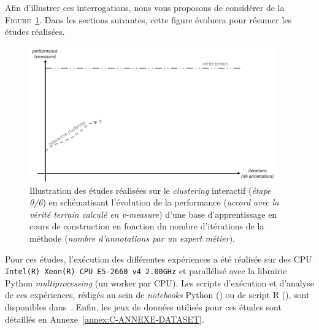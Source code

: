 	Afin d'illustrer ces interrogations, nous vous proposons de considérer de la \textsc{Figure~\ref{figure:4.0-HYPOTHESE-00-DEFAULT}}. Dans les sections suivantes, cette figure évoluera pour résumer les études réalisées.
	\begin{figure}[!htb]
		\centering
		\includegraphics[width=0.95\textwidth]{figures/hypotheses-00-default}
		\caption{
			Illustration des études réalisées sur le \textit{clustering} interactif (\textit{étape 0/6}) en schématisant l'évolution de la performance (\textit{accord avec la vérité terrain calculé en v-measure}) d'une base d'apprentissage en cours de construction en fonction du nombre d'itérations de la méthode (\textit{nombre d'annotations par un expert métier}).
		}
		\label{figure:4.0-HYPOTHESE-00-DEFAULT}
	\end{figure}
	
	
	\begin{leftBarInformation}
		Pour ces études, l'exécution des différentes expériences a été réalisée sur des CPU \texttt{Intel(R) Xeon(R) CPU E5-2660 v4 \@ 2.00GHz} et parallélisé avec la librairie Python \textit{multiprocessing} (un worker par CPU).
		Les scripts d'exécution et d'analyse de ces expériences, rédigés au sein de \textit{notebooks} Python (\cite{van-rossum-drake:2009:python-reference-manual}) ou de script R (\cite{r-core-team:2017:language-environment-statistical}), sont disponibles dans~\cite{schild:2021:cognitivefactory-interactiveclusteringcomparativestudy}.
		Enfin, les jeux de données utilisés pour ces études sont détaillés en Annexe~\ref{annex:C-ANNEXE-DATASET}.
	\end{leftBarInformation}
	
